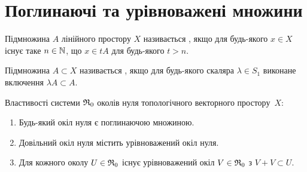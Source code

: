\section{Поглинаючі та урівноважені множини}

\begin{definition}
    Підмножина $A$ лінійного простору $X$ називається , якщо для будь-якого $x \in X$ існує таке $n \in \NN$, що $x \in t A$ для будь-якого $t > n$.
\end{definition}

\begin{definition}
    Підмножина $A \subset X$ називається , якщо для будь-якого скаляра $\lambda \in S_1$ виконане включення $\lambda A \subset A$.
\end{definition}

\begin{theorem}
    \label{th:tvs-zero-neighbourhood-properties}
    Властивості системи $\frak R_0$ околів нуля топологічного векторного простору~$X$:
    \begin{enumerate}
        \item Будь-який окіл нуля є поглинаючою множиною.
        \item Довільний окіл нуля містить урівноважений окіл нуля.
        \item Для кожного околу $U \in \frak R_0$ існує урівноважений окіл $V \in \frak R_0$ з $V + V \subset U$.
    \end{enumerate}
\end{theorem}

